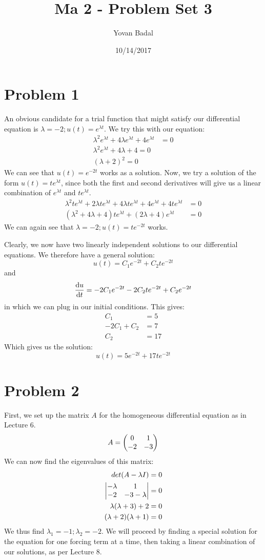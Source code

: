 \documentclass[11pt]{article}
\begin{document}
	\title{Ma 2 - Problem Set 3}
	\author{Yovan Badal}
	\date{10/14/2017}
	\maketitle
	
\section*{Problem 1}
An obvious candidate for a trial function that might satisfy our differential equation is $\lambda = -2; u(t) = e^{\lambda t}$. We try this with our equation:
\begin{align*}
\lambda^2 e^{\lambda t} + 4 \lambda e^{\lambda t} + 4e^{\lambda t} &= 0 \\
\lambda^2 e^{\lambda t} + 4 \lambda + 4 = 0 \\
(\lambda +2)^2 = 0
\end{align*}
We can see that $u(t)=e^{-2t}$ works as a solution. Now, we try a solution of the form $u(t) = te^{\lambda t}$, since both the first and second derivatives will give us a linear combination of $e^{\lambda t}$ and $te^{\lambda t}$.
\begin{align*}
\lambda^2 t e^{\lambda t} + 2 \lambda t e^{\lambda t} + 4 \lambda t e^{\lambda t} + 4e^{\lambda t} + 4te^{\lambda t} &= 0 \\
(\lambda^2 + 4\lambda +4)te^{\lambda t} + (2\lambda +4)e^{\lambda t} &= 0
\end{align*}
We can again see that $\lambda = -2; u(t) = te^{-2t}$ works.

Clearly, we now have two linearly independent solutions to our differential equations. We therefore have a general solution:
\[
u(t) = C_1 e^{-2t} + C_2 te^{-2t}
\] and 
\[
\dv{u}{t} = -2C_1e^{-2t} - 2C_2te^{-2t} + C_2 e^{-2t}
\]
in which we can plug in our initial conditions. This gives:
\begin{align*}
C_1 &= 5 \\
-2C_1 + C_2 &= 7 \\
C_2 &= 17
\end{align*}
Which gives us the solution:
\[
u(t) = 5e^{-2t} + 17te^{-2t}
\]

\section*{Problem 2}
First, we set up the matrix $A$ for the homogeneous differential equation as in Lecture 6.
\[
A = \mqty(0 & 1 \\ -2 & -3)
\]
We can now find the eigenvalues of this matrix:
\begin{align*}
det(A-\lambda I) &= 0 \\
\mdet{-\lambda & 1 \\ -2 & -3-\lambda} &= 0 \\
\lambda(\lambda + 3) + 2 &= 0 \\
(\lambda + 2)(\lambda + 1) &= 0
\end{align*}
We thus find $\lambda_1 = -1; \lambda_2 = -2$. We will proceed by finding a special solution for the equation for one forcing term at a time, then taking a linear combination of our solutions, as per Lecture 8.
\end{document}
